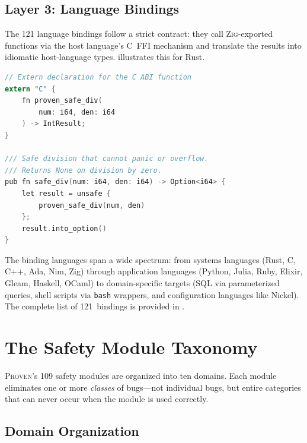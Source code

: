 \documentclass[11pt,a4paper]{article}
\newcommand{\proven}{\textsc{Proven}}
\newcommand{\zig}{\textsc{Zig}}
\newcommand{\code}[1]{\texttt{#1}}
\begin{document}
\subsection{Layer 3: Language Bindings}
\label{sec:layer3}

The 121 language bindings follow a strict contract: they call \zig{}-exported
functions via the host language's C~FFI mechanism and translate the results
into idiomatic host-language types.  illustrates
this for Rust.

\begin{lstlisting}[language=C, caption={Rust binding for safe division.
The \code{unsafe} block is required by Rust's FFI but does not indicate
unsafety---the called function is total and memory-safe by
construction.}, label=lst:rust-binding]
// Extern declaration for the C ABI function
extern "C" {
    fn proven_safe_div(
        num: i64, den: i64
    ) -> IntResult;
}

/// Safe division that cannot panic or overflow.
/// Returns None on division by zero.
pub fn safe_div(num: i64, den: i64) -> Option<i64> {
    let result = unsafe {
        proven_safe_div(num, den)
    };
    result.into_option()
}
\end{lstlisting}

The binding languages span a wide spectrum: from systems languages (Rust,
C, C++, Ada, Nim, Zig) through application languages (Python, Julia, Ruby,
Elixir, Gleam, Haskell, OCaml) to domain-specific targets (SQL via
parameterized queries, shell scripts via \code{bash} wrappers, and
configuration languages like Nickel). The complete list of 121~bindings
is provided in .


\section{The Safety Module Taxonomy}
\label{sec:taxonomy}

\proven{}'s 109 safety modules are organized into ten domains. Each module
eliminates one or more \emph{classes} of bugs---not individual bugs, but
entire categories that can never occur when the module is used correctly.

\subsection{Domain Organization}
\end{document}
